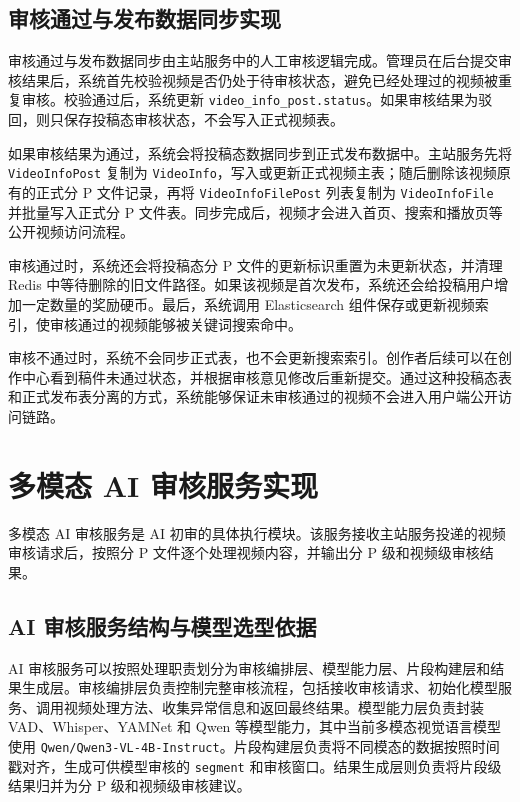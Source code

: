\subsection{审核通过与发布数据同步实现}

审核通过与发布数据同步由主站服务中的人工审核逻辑完成。管理员在后台提交审核结果后，系统首先校验视频是否仍处于待审核状态，避免已经处理过的视频被重复审核。校验通过后，系统更新 \texttt{video\_info\_post.status}。如果审核结果为驳回，则只保存投稿态审核状态，不会写入正式视频表。

如果审核结果为通过，系统会将投稿态数据同步到正式发布数据中。主站服务先将 \texttt{VideoInfoPost} 复制为 \texttt{VideoInfo}，写入或更新正式视频主表；随后删除该视频原有的正式分 P 文件记录，再将 \texttt{VideoInfoFilePost} 列表复制为 \texttt{VideoInfoFile} 并批量写入正式分 P 文件表。同步完成后，视频才会进入首页、搜索和播放页等公开视频访问流程。

审核通过时，系统还会将投稿态分 P 文件的更新标识重置为未更新状态，并清理 Redis 中等待删除的旧文件路径。如果该视频是首次发布，系统还会给投稿用户增加一定数量的奖励硬币。最后，系统调用 Elasticsearch 组件保存或更新视频索引，使审核通过的视频能够被关键词搜索命中。

审核不通过时，系统不会同步正式表，也不会更新搜索索引。创作者后续可以在创作中心看到稿件未通过状态，并根据审核意见修改后重新提交。通过这种投稿态表和正式发布表分离的方式，系统能够保证未审核通过的视频不会进入用户端公开访问链路。

\section{多模态 AI 审核服务实现}

多模态 AI 审核服务是 AI 初审的具体执行模块。该服务接收主站服务投递的视频审核请求后，按照分 P 文件逐个处理视频内容，并输出分 P 级和视频级审核结果。

\subsection{AI 审核服务结构与模型选型依据}

AI 审核服务可以按照处理职责划分为审核编排层、模型能力层、片段构建层和结果生成层。审核编排层负责控制完整审核流程，包括接收审核请求、初始化模型服务、调用视频处理方法、收集异常信息和返回最终结果。模型能力层负责封装 VAD、Whisper、YAMNet 和 Qwen 等模型能力，其中当前多模态视觉语言模型使用 \texttt{Qwen/Qwen3-VL-4B-Instruct}。片段构建层负责将不同模态的数据按照时间戳对齐，生成可供模型审核的 \texttt{segment} 和审核窗口。结果生成层则负责将片段级结果归并为分 P 级和视频级审核建议。

